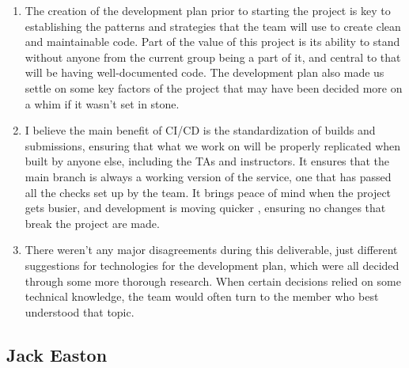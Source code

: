\documentclass{article}
\begin{document}
\begin{enumerate}
    \item The creation of the development plan prior to starting the project is key to establishing the patterns and strategies 
 that the team will use to create clean and maintainable code. Part of the value of this project is its ability to stand without 
 anyone from the current group being a part of it, and central to that will be having well-documented code. The development plan also 
 made us settle on some key factors of the project that may have been decided more on a whim if it wasn't set in stone.

    \item I believe the main benefit of CI/CD is the standardization of builds and submissions, ensuring that what we work on will be properly 
 replicated when built by anyone else, including the TAs and instructors. It ensures that the main branch is always a working version of the 
 service, one that has passed all the checks set up by the team. It brings peace of mind when the project gets busier, and development is moving quicker 
 , ensuring no changes that break the project are made.

    \item There weren't any major disagreements during this deliverable, just different suggestions for technologies for the 
 development plan, which were all decided through some more thorough research. When certain decisions relied on 
 some technical knowledge, the team would often turn to the member who best understood that topic.
\end{enumerate}
\subsection*{Jack Easton}
\end{document}
